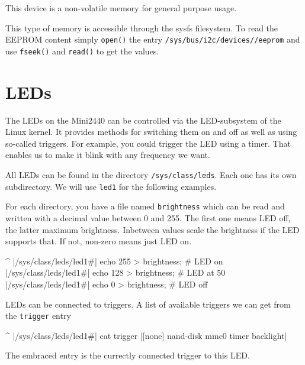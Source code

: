 This device is a \perEepromSize{} non-volatile memory for general purpose usage.

This type of memory is accessible through the sysfs filesystem. To read the
EEPROM content simply \texttt{open()} the entry
\texttt{/sys/bus/i2c/devices/\perEepromPath{}/eeprom} and use
\texttt{fseek()} and \texttt{read()} to get the values.


\newcommand{\perLedName}{led1}
\newcommand{\perAvailableTriggers}{[none] nand-disk mmc0 timer backlight}

\newcommand{\LedPath}{/sys/class/leds/\perLedName\#}

\section{LEDs}				\label{sec:LED}

The LEDs on the Mini2440 can be controlled via the LED-subsystem of the Linux
kernel. It provides methods for switching them on and off as well as using
so-called triggers.  For example, you could trigger the LED using a timer.
That enables us to make it blink with any frequency we want.

All LEDs can be found in the directory \texttt{/sys/class/leds}. Each one has
its own subdirectory. We will use \texttt{\perLedName} for the following
examples.

For each directory, you have a file named \texttt{brightness} which can be read and
written with a decimal value between 0 and 255. The first one means LED off,
the latter maximum brightness. Inbetween values scale the brightness if the LED
supports that. If not, non-zero means just LED on.

\begin{ptxshell}[escapechar=|]{^}
|\LedPath| echo 255 > brightness; # LED on
|\LedPath| echo 128 > brightness; # LED at 50%
|\LedPath| echo 0 > brightness; # LED off
\end{ptxshell}

LEDs can be connected to triggers. A list of available triggers we can get from the
\texttt{trigger} entry

\begin{ptxshell}[escapechar=|]{^}
|\LedPath| cat trigger
|\perAvailableTriggers{}|
\end{ptxshell}

The embraced entry is the currectly connected trigger to this LED.

